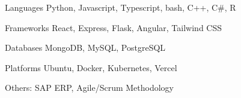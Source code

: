 

\begin{cvskills}

  \cvskill
  {Languages} %
  {} %
  {Python, Javascript, Typescript, bash, C++, C\#, R} %

  \cvskill
  {Frameworks} %
  {} %
  {React, Express, Flask, Angular, Tailwind CSS} %

  \cvskill
  {Databases} %
  {} %
  {MongoDB, MySQL, PostgreSQL} %

  \cvskill
  {Platforms} %
  {} %
  {Ubuntu, Docker, Kubernetes, Vercel} %


  \cvskill
  {Others:} %
  {} %
  {SAP ERP, Agile/Scrum Methodology} %



\end{cvskills}
